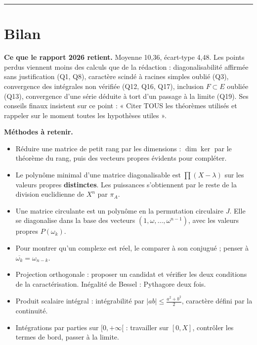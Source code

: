 \documentclass[11pt,a4paper]{article}
\providecommand{\tightlist}{\setlength{\itemsep}{0pt}\setlength{\parskip}{0pt}}
\begin{document}
\begin{center}\rule{0.5\linewidth}{0.5pt}\end{center}

\hypertarget{bilan}{%
\section{Bilan}\label{bilan}}

\textbf{Ce que le rapport 2026 retient.} Moyenne 10,36, écart-type 4,48. Les points perdus viennent moins des calculs que de la rédaction : diagonalisabilité affirmée sans justification (Q1, Q8), caractère scindé à racines simples oublié (Q3), convergence des intégrales non vérifiée (Q12, Q16, Q17), inclusion \(F\subset E\) oubliée (Q13), convergence d'une série déduite à tort d'un passage à la limite (Q19). Ses conseils finaux insistent sur ce point : « Citer TOUS les théorèmes utilisés et rappeler sur le moment toutes les hypothèses utiles ».

\textbf{Méthodes à retenir.}

\begin{itemize}
\tightlist
\item
  Réduire une matrice de petit rang par les dimensions : \(\dim\ker\) par le théorème du rang, puis des vecteurs propres évidents pour compléter.
\item
  Le polynôme minimal d'une matrice diagonalisable est \(\prod(X-\lambda)\) sur les valeurs propres \textbf{distinctes}. Les puissances s'obtiennent par le reste de la division euclidienne de \(X^n\) par \(\pi_A\).
\item
  Une matrice circulante est un polynôme en la permutation circulaire \(J\). Elle se diagonalise dans la base des vecteurs \((1,\omega,\dots,\omega^{n-1})\), avec les valeurs propres \(P(\omega_k)\).
\item
  Pour montrer qu'un complexe est réel, le comparer à son conjugué ; penser à \(\overline{\omega_k}=\omega_{n-k}\).
\item
  Projection orthogonale : proposer un candidat et vérifier les deux conditions de la caractérisation. Inégalité de Bessel : Pythagore deux fois.
\item
  Produit scalaire intégral : intégrabilité par \(|ab|\le\frac{a^2+b^2}2\), caractère défini par la continuité.
\item
  Intégrations par parties sur \([0,+\infty[\) : travailler sur \([0,X]\), contrôler les termes de bord, passer à la limite.
\end{itemize}
\end{document}
